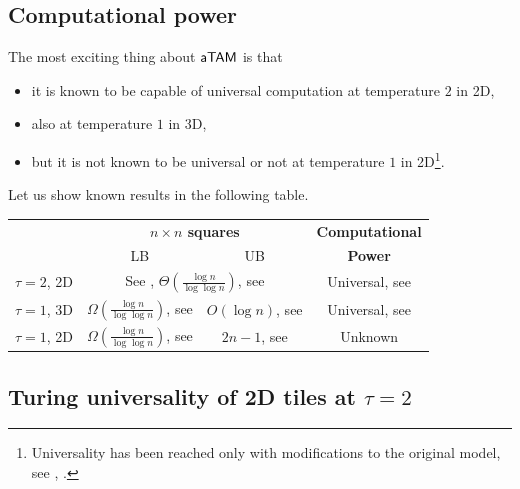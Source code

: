 \subsection{Computational power}\label{sec:wang_power}
	
	The most exciting thing about $\mathsf{aTAM}$ is that
	\begin{itemize}
		\item it is known to be capable of universal computation at temperature $2$ in 2D,
		\item also at temperature $1$ in 3D,
		\item but it is not known to be universal or not at temperature $1$ in 2D\footnote{Universality has been reached only with modifications to the original model, see \cite{stage_assembly}, \cite{active_tiles}.}.
	\end{itemize}
	Let us show known results in the following table.
	
	\begin{center}
	\begin{tabular}{|| c || c | c | c ||}
		\hline\hline
		~ & \multicolumn{2}{c|}{\bf $n\times n$ squares} & {\bf Computational} \\
		~ & \multicolumn{1}{c}{LB} & \multicolumn{1}{c|}{UB} & {\bf Power}\\
		\hline
		$\tau=2$, 2D & \multicolumn{2}{c|}{See \cite{square_lb}, $\Theta(\frac{\log n}{\log\log n})$, see \cite{square_ub}} & Universal, see \cite{winfree_phd} \\
		\hline
		$\tau=1$, 3D & $\Omega(\frac{\log n}{\log\log n})$, see \cite{square_lb} & $O(\log n)$, see \cite{cook_temp1} & Universal, see \cite{cook_temp1} \\
		\hline
		$\tau=1$, 2D & $\Omega(\frac{\log n}{\log\log n})$, see \cite{square_lb} & $2n-1$, see \cite{square_lb} & Unknown \\
		\hline\hline
	\end{tabular}
	\end{center}

\subsection{Turing universality of 2D tiles at $\tau=2$}
	
